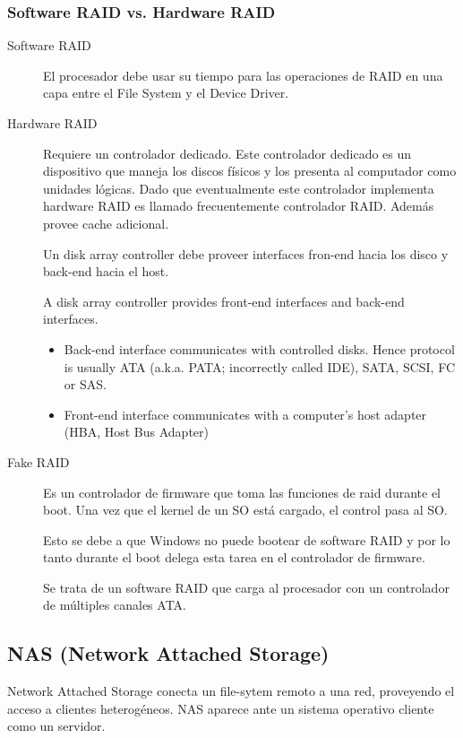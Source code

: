 \documentclass[a4paper, twoside]{article}
\begin{document}
\subsubsection{Software RAID vs. Hardware RAID}
\begin{description}
	\item[Software RAID] El procesador debe usar su tiempo para las operaciones de RAID en una capa entre el File System y el Device Driver.

	\item[Hardware RAID] Requiere un controlador dedicado. Este controlador dedicado es un dispositivo que maneja los discos físicos y los presenta al computador como unidades lógicas. Dado que eventualmente este controlador implementa hardware RAID es llamado frecuentemente controlador RAID. Además provee cache adicional.

	Un disk array controller debe proveer interfaces fron-end hacia los disco y back-end hacia el host.

	A disk array controller provides front-end interfaces and back-end interfaces.
	\begin{itemize}
		\item Back-end interface communicates with controlled disks. Hence protocol is usually ATA (a.k.a. PATA; incorrectly called IDE), SATA, SCSI, FC or SAS.
		\item Front-end interface communicates with a computer's host adapter (HBA, Host Bus Adapter)
	\end{itemize}

	\item[Fake RAID] Es un controlador de firmware que toma las funciones de raid durante el boot. Una vez que el kernel de un SO está cargado, el control pasa al SO.

	Esto se debe a que Windows no puede bootear de software RAID y por lo tanto durante el boot delega esta tarea en el controlador de firmware. 

	Se trata de un software RAID que carga al procesador con un  controlador de múltiples canales ATA.
\end{description}

\subsection{NAS (Network Attached Storage)}
Network Attached Storage conecta un file-sytem remoto a una red, proveyendo el acceso a clientes heterogéneos. NAS aparece ante un sistema operativo cliente como un servidor.
\end{document}
